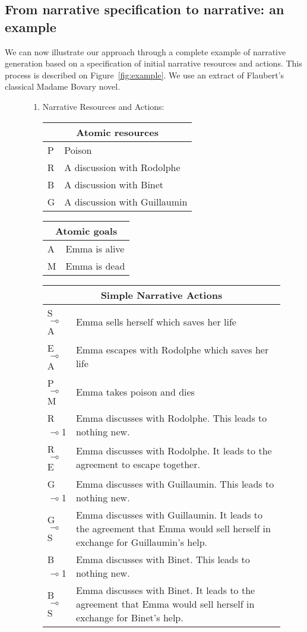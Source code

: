 \documentclass[runningheads,a4paper]{llncs}
\begin{document}
\subsection{From narrative specification to narrative: an example}
We can now illustrate our approach through a complete example of narrative generation based on a specification of initial narrative resources and actions. This process is described on Figure~\ref{fig:example}. We use an extract of Flaubert's classical Madame Bovary novel. 
\begin{figure}
\begin{enumerate}
\item Narrative Resources and Actions:

\vspace{0.1in}
\begin{tabular} {|l|l|}
\hline
\multicolumn{2}{|c|}{Atomic resources}\\ \hline
P      & Poison\\
R      & A discussion with Rodolphe\\
B      & A discussion with Binet\\
G      & A discussion with Guillaumin\\
\hline
\end{tabular}
\begin{tabular}{|l|l|}
\hline
\multicolumn{2}{|c|}{Atomic goals}\\ \hline
A     & Emma is alive\\
M     & Emma is dead\\
\hline
\end{tabular}

\vspace{0.1in}
\begin{tabular}{|p{}|p{}|}
\hline
\multicolumn{2}{|c|}{Simple Narrative Actions}\\ \hline
S$\multimap$A & Emma sells herself which saves her life\\
E$\multimap$A & Emma escapes with Rodolphe which saves her life\\
P$\multimap$M & Emma takes poison and dies\\ 
R$\multimap$1 & Emma discusses with Rodolphe. This leads to nothing new.\\
R$\multimap$E & Emma discusses with Rodolphe. It leads to the agreement to escape together.\\
G$\multimap$1 & Emma discusses with Guillaumin. This leads to nothing new.\\
G$\multimap$S & Emma discusses with Guillaumin. It leads to the agreement that Emma would sell herself in exchange for Guillaumin's help.\\
B$\multimap$1 & Emma discusses with Binet. This leads to nothing new.\\
B$\multimap$S & Emma discusses with Binet. It leads to the agreement that Emma would sell herself in exchange for Binet's help.\\
\hline
\end{tabular}


\end{enumerate}
\end{figure}
\end{document}
